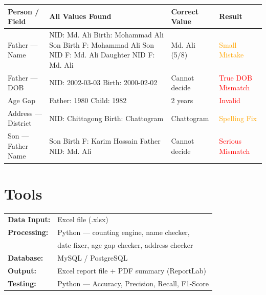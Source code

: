 \documentclass[12pt, a4paper]{article}
\begin{document}
\begin{center}
\begin{tabular}{|p{2.5cm}|p{3.5cm}|p{3cm}|p{3cm}|}
    \hline
    \textbf{Person / Field} & \textbf{All Values Found} & \textbf{Correct Value} & \textbf{Result} \\
    \hline
    Father --- Name &
    NID: Md. Ali \newline Birth: Mohammad Ali \newline Son Birth F: Mohammad Ali \newline Son NID F: Md. Ali \newline Daughter NID F: Md. Ali &
    Md. Ali (5/8) &
    \textcolor{orange}{Small Mistake} \\
    \hline
    Father --- DOB &
    NID: 2002-03-03 \newline Birth: 2000-02-02 &
    Cannot decide &
    \textcolor{red}{True DOB Mismatch} \\
    \hline
    Age Gap &
    Father: 1980 \newline Child: 1982 &
    2 years &
    \textcolor{red}{Invalid} \\
    \hline
    Address --- District &
    NID: Chittagong \newline Birth: Chattogram &
    Chattogram &
    \textcolor{orange}{Spelling Fix} \\
    \hline
    Son --- Father Name &
    Son Birth F: Karim Hossain \newline Father NID: Md. Ali &
    Cannot decide &
    \textcolor{red}{Serious Mismatch} \\
    \hline
\end{tabular}
\end{center}

\section{Tools}

\begin{tabular}{ll}
    \textbf{Data Input:}  & Excel file (.xlsx) \\
    \textbf{Processing:}  & Python --- counting engine, name checker, \\
                          & date fixer, age gap checker, address checker \\
    \textbf{Database:}    & MySQL / PostgreSQL \\
    \textbf{Output:}      & Excel report file + PDF summary (ReportLab) \\
    \textbf{Testing:}     & Python --- Accuracy, Precision, Recall, F1-Score \\
\end{tabular}
\end{document}
